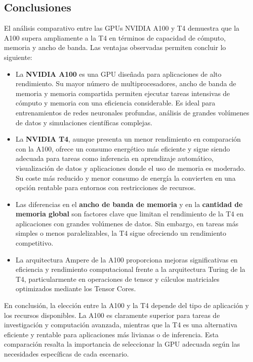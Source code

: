\documentclass[twocolumn,a4paper,12pt]{article}
\begin{document}
\subsection{Conclusiones}
El análisis comparativo entre las GPUs NVIDIA A100 y T4 demuestra que la A100 supera ampliamente a la T4 en términos de capacidad de cómputo, memoria y ancho de banda. Las ventajas observadas permiten concluir lo siguiente:

\begin{itemize}
    \item La \textbf{NVIDIA A100} es una GPU diseñada para aplicaciones de alto rendimiento. Su mayor número de multiprocesadores, ancho de banda de memoria y memoria compartida permiten ejecutar tareas intensivas de cómputo y memoria con una eficiencia considerable. Es ideal para entrenamientos de redes neuronales profundas, análisis de grandes volúmenes de datos y simulaciones científicas complejas.

    \item La \textbf{NVIDIA T4}, aunque presenta un menor rendimiento en comparación con la A100, ofrece un consumo energético más eficiente y sigue siendo adecuada para tareas como inferencia en aprendizaje automático, visualización de datos y aplicaciones donde el uso de memoria es moderado. Su coste más reducido y menor consumo de energía la convierten en una opción rentable para entornos con restricciones de recursos.

    \item Las diferencias en el \textbf{ancho de banda de memoria} y en la \textbf{cantidad de memoria global} son factores clave que limitan el rendimiento de la T4 en aplicaciones con grandes volúmenes de datos. Sin embargo, en tareas más simples o menos paralelizables, la T4 sigue ofreciendo un rendimiento competitivo.

    \item La arquitectura Ampere de la A100 proporciona mejoras significativas en eficiencia y rendimiento computacional frente a la arquitectura Turing de la T4, particularmente en operaciones de tensor y cálculos matriciales optimizados mediante los Tensor Cores.

\end{itemize}

En conclusión, la elección entre la A100 y la T4 depende del tipo de aplicación y los recursos disponibles. La A100 es claramente superior para tareas de investigación y computación avanzada, mientras que la T4 es una alternativa eficiente y rentable para aplicaciones más livianas o de inferencia. Esta comparación resalta la importancia de seleccionar la GPU adecuada según las necesidades específicas de cada escenario.
\end{document}
